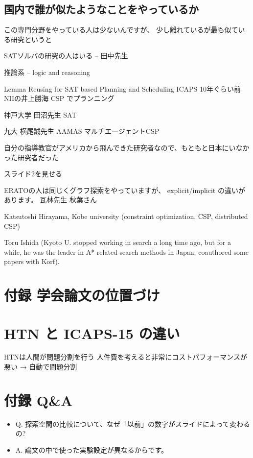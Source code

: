 \subsection{国内で誰が似たようなことをやっているか}
\label{sec-21-1}

この専門分野をやっている人は少ないんですが、
少し離れているが最も似ている研究というと

SATソルバの研究の人はいる -- 田中先生

推論系 -- logic and reasoning

Lemma Reusing for SAT based Planning and Scheduling
ICAPS 10年ぐらい前 NIIの井上勝海 CSP でプランニング

神戸大学
田沼先生 SAT

九大 横尾誠先生
AAMAS マルチエージェントCSP

自分の指導教官がアメリカから飛んできた研究者なので、もともと日本にいなかった研究者だった

スライド2を見せる

ERATOの人は同じくグラフ探索をやっていますが、
explicit/implicit の違いがあります。
瓦林先生
秋葉さん

Katsutoshi Hirayama, Kobe university  (constraint optimization, CSP, distributed CSP)

Toru Ishida (Kyoto U. stopped working in search a long time ago, but for a while, he was the leader in A*-related search methods in Japan; coauthored some papers with Korf).

\section{付録 学会論文の位置づけ}
\label{sec-22}

\section{HTN と ICAPS-15 の違い}
\label{sec-23}

HTNは人間が問題分割を行う
人件費を考えると非常にコストパフォーマンスが悪い
→ 自動で問題分割

\section{付録 Q\&A}
\label{sec-24}

\begin{itemize}
\item Q. 探索空間の比較について、なぜ「以前」の数字がスライドによって変わるの?
\item A. 論文の中で使った実験設定が異なるからです。
\end{itemize}

